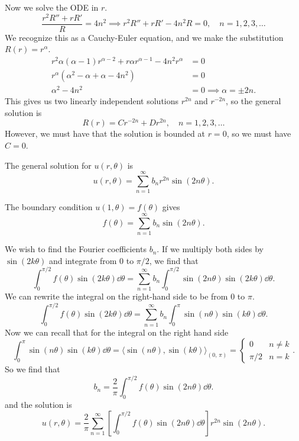 \documentclass[plain]{pset}
\begin{document}
\begin{solution}
    Now we solve the ODE in \(r\).
    \[\frac{r^2R'' + rR'}{R} = 4n^2 \implies r^2R'' + rR' - 4n^2R = 0, \quad n = 1, 2, 3, \ldots\]
    We recognize this as a Cauchy-Euler equation, and we make the substitution \(R(r) = r^\alpha\).
    \begin{align*}
        r^2\alpha(\alpha - 1)r^{\alpha - 2} + r\alpha r^{\alpha - 1} - 4n^2r^\alpha & = 0                           \\
        r^\alpha(\alpha^2 - \alpha + \alpha - 4n^2)                                 & = 0                           \\
        \alpha^2 - 4n^2                                                             & = 0 \implies \alpha = \pm 2n.
    \end{align*}
    This gives us two linearly independent solutions \(r^{2n}\) and \(r^{-2n}\), so the general solution is
    \[R(r) = Cr^{-2n} + Dr^{2n}, \quad n = 1, 2, 3, \ldots\]
    However, we must have that the solution is bounded at \(r = 0\), so we must have \(C = 0\).

    The general solution for \(u(r, \theta)\) is
    \[u(r, \theta) = \sum_{n = 1}^\infty b_n r^{2n}\sin(2n\theta).\]

    The boundary condition \(u(1, \theta) = f(\theta)\) gives
    \[f(\theta) = \sum_{n = 1}^\infty b_n\sin(2n\theta).\]

    We wish to find the Fourier coefficients \(b_n\). If we multiply both sides by \(\sin(2k\theta)\) and integrate from \(0\) to \(\pi/2\), we find that
    \[\int_0^{\pi/2} f(\theta)\sin(2k\theta) \dd{\theta} = \sum_{n = 1}^\infty b_n\int_0^{\pi/2} \sin(2n\theta)\sin(2k\theta) \dd{\theta}.\]
    We can rewrite the integral on the right-hand side to be from \(0\) to \(\pi\).
    \[\int_0^{\pi/2} f(\theta)\sin(2k\theta) \dd{\theta} = \sum_{n = 1}^\infty b_n\int_0^{\pi} \sin(n\theta)\sin(k\theta) \dd{\theta}.\]
    Now we can recall that for the integral on the right hand side
    \[\int_0^\pi \sin(n\theta)\sin(k\theta) \dd{\theta} = \langle \sin(n\theta), \sin(k\theta) \rangle_{(0,\,\pi)} = \begin{cases} 0 & n \neq k \\ \pi/2 & n = k \end{cases}.\]
    So we find that
    \[b_n = \frac{2}{\pi}\int_0^{\pi/2} f(\theta)\sin(2n\theta) \dd{\theta}.\]
    and the solution is
    \[u(r, \theta) = \frac{2}{\pi}\sum_{n = 1}^\infty \left[\int_0^{\pi/2} f(\theta)\sin(2n\theta) \dd{\theta}\right] r^{2n}\sin(2n\theta).\]
\end{solution}
\end{document}
